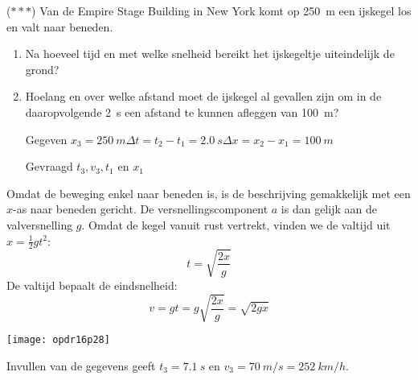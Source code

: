 \documentclass{ximera}
\begin{document}
\begin{exercise}
    ($\ast\ast\ast$) Van de Empire Stage Building in New York komt op \SI{250}{m} een ijskegel los en valt naar beneden.
    \begin{enumerate}
        \item Na hoeveel tijd en met welke snelheid bereikt het ijskegeltje uiteindelijk de grond?
        \item Hoelang en over welke afstand moet de ijskegel al gevallen zijn om in de daaropvolgende \SI{2}{s} een afstand te kunnen afleggen van \SI{100}{m}?
    \end{enumerate}
    \begin{oplossing}
        \begin{enumerate}
            \item[Gegeven]$x_3=\SI{250}{m}$\newline$\Delta t=t_2-t_1=\SI{2,0}{s}$\newline$\Delta x=x_2-x_1=\SI{100}{m}$
            \item[Gevraagd]$t_3,v_3,t_1$ en $x_1$
        \end{enumerate}

        Omdat de beweging enkel naar beneden is, is de beschrijving gemakkelijk met een $x$-as naar beneden gericht. De versnellingscomponent $a$ is dan gelijk aan de valversnelling $g$. Omdat de kegel vanuit rust vertrekt, vinden we de valtijd uit $x=\frac{1}{2}gt^2$:
        \begin{equation*}   
            t=\sqrt{\frac{2x}{g}}
        \end{equation*}
        De valtijd bepaalt de eindsnelheid:
        \begin{equation*}
            v=gt=g\sqrt{\frac{2x}{g}}=\sqrt{2gx}
        \end{equation*}
        \begin{image}
            \texttt{[image: opdr16p28]}
        \end{image}
        Invullen van de gegevens geeft $t_3=\SI{7,1}{s}$ en $v_3=\SI{70}{m/s}=\SI{252}{km/h}$.


\end{oplossing}
\end{exercise}
\end{document}
